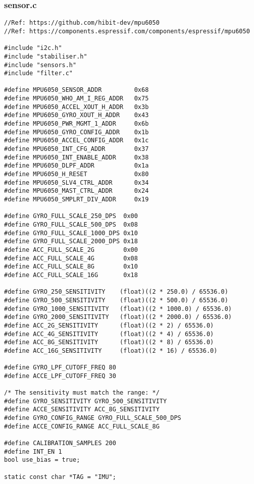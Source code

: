 \subsubsection{sensor.c}
\label{app:sensor-code}

\begin{lstlisting}[caption={Register Read}]
//Ref: https://github.com/hibit-dev/mpu6050
//Ref: https://components.espressif.com/components/espressif/mpu6050

#include "i2c.h"
#include "stabiliser.h"
#include "sensors.h"
#include "filter.c"

#define MPU6050_SENSOR_ADDR         0x68
#define MPU6050_WHO_AM_I_REG_ADDR   0x75
#define MPU6050_ACCEL_XOUT_H_ADDR   0x3b 
#define MPU6050_GYRO_XOUT_H_ADDR    0x43
#define MPU6050_PWR_MGMT_1_ADDR     0x6b 
#define MPU6050_GYRO_CONFIG_ADDR    0x1b
#define MPU6050_ACCEL_CONFIG_ADDR   0x1c
#define MPU6050_INT_CFG_ADDR        0x37
#define MPU6050_INT_ENABLE_ADDR     0x38
#define MPU6050_DLPF_ADDR           0x1a
#define MPU6050_H_RESET             0x80
#define MPU6050_SLV4_CTRL_ADDR      0x34
#define MPU6050_MAST_CTRL_ADDR      0x24
#define MPU6050_SMPLRT_DIV_ADDR     0x19

#define GYRO_FULL_SCALE_250_DPS  0x00
#define GYRO_FULL_SCALE_500_DPS  0x08
#define GYRO_FULL_SCALE_1000_DPS 0x10
#define GYRO_FULL_SCALE_2000_DPS 0x18
#define ACC_FULL_SCALE_2G        0x00
#define ACC_FULL_SCALE_4G        0x08
#define ACC_FULL_SCALE_8G        0x10
#define ACC_FULL_SCALE_16G       0x18

#define GYRO_250_SENSITIVITY    (float)((2 * 250.0) / 65536.0)
#define GYRO_500_SENSITIVITY    (float)((2 * 500.0) / 65536.0)
#define GYRO_1000_SENSITIVITY   (float)((2 * 1000.0) / 65536.0)
#define GYRO_2000_SENSITIVITY   (float)((2 * 2000.0) / 65536.0)
#define ACC_2G_SENSITIVITY      (float)((2 * 2) / 65536.0)
#define ACC_4G_SENSITIVITY      (float)((2 * 4) / 65536.0)
#define ACC_8G_SENSITIVITY      (float)((2 * 8) / 65536.0)
#define ACC_16G_SENSITIVITY     (float)((2 * 16) / 65536.0)

#define GYRO_LPF_CUTOFF_FREQ 80
#define ACCE_LPF_CUTOFF_FREQ 30

/* The sensitivity must match the range: */
#define GYRO_SENSITIVITY GYRO_500_SENSITIVITY
#define ACCE_SENSITIVITY ACC_8G_SENSITIVITY
#define GYRO_CONFIG_RANGE GYRO_FULL_SCALE_500_DPS
#define ACCE_CONFIG_RANGE ACC_FULL_SCALE_8G

#define CALIBRATION_SAMPLES 200
#define INT_EN 1
bool use_bias = true;

static const char *TAG = "IMU";


\end{lstlisting}
